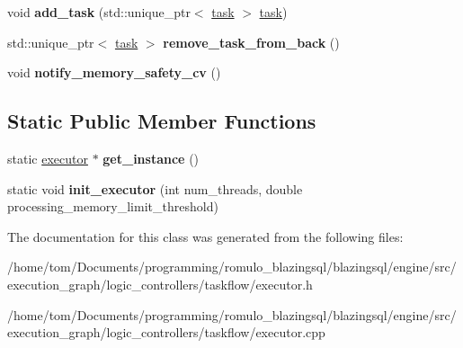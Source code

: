 \begin{DoxyCompactItemize}
\item 
\mbox{\label{classral_1_1execution_1_1executor_a2877afac758bb887955083a58f645e25}} 
void {\bfseries add\+\_\+task} (std\+::unique\+\_\+ptr$<$ \hyperlink{classral_1_1execution_1_1task}{task} $>$ \hyperlink{classral_1_1execution_1_1task}{task})
\item 
\mbox{\label{classral_1_1execution_1_1executor_a2eee292b6f3aa81c120431cc64e155f0}} 
std\+::unique\+\_\+ptr$<$ \hyperlink{classral_1_1execution_1_1task}{task} $>$ {\bfseries remove\+\_\+task\+\_\+from\+\_\+back} ()
\item 
\mbox{\label{classral_1_1execution_1_1executor_a898f9b6d96ea8994790ea4a142ddb4f5}} 
void {\bfseries notify\+\_\+memory\+\_\+safety\+\_\+cv} ()
\end{DoxyCompactItemize}
\subsection*{Static Public Member Functions}
\begin{DoxyCompactItemize}
\item 
\mbox{\label{classral_1_1execution_1_1executor_a79eb5575c98cca07b162018e50e91e4b}} 
static \hyperlink{classral_1_1execution_1_1executor}{executor} $\ast$ {\bfseries get\+\_\+instance} ()
\item 
\mbox{\label{classral_1_1execution_1_1executor_a0bd22a4c3d346642f762193878c6395b}} 
static void {\bfseries init\+\_\+executor} (int num\+\_\+threads, double processing\+\_\+memory\+\_\+limit\+\_\+threshold)
\end{DoxyCompactItemize}


The documentation for this class was generated from the following files\+:\begin{DoxyCompactItemize}
\item 
/home/tom/\+Documents/programming/romulo\+\_\+blazingsql/blazingsql/engine/src/execution\+\_\+graph/logic\+\_\+controllers/taskflow/executor.\+h\item 
/home/tom/\+Documents/programming/romulo\+\_\+blazingsql/blazingsql/engine/src/execution\+\_\+graph/logic\+\_\+controllers/taskflow/executor.\+cpp\end{DoxyCompactItemize}
